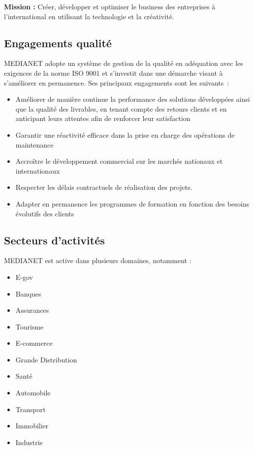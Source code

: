 \noindent
\textbf{Mission :} Créer, développer et optimiser le business des entreprises à l’international en utilisant la technologie et la créativité.

\subsection{Engagements qualité}

MEDIANET adopte un système de gestion de la qualité en adéquation avec les exigences de la norme ISO 9001 et s'investit dans une démarche visant à s'améliorer en permanence. Ses principaux engagements sont les suivants :

\begin{itemize}
\item Améliorer de manière continue la performance des solutions développées ainsi que la qualité des livrables, en tenant compte des retours clients et en anticipant leurs attentes afin de renforcer leur satisfaction
\item Garantir une réactivité efficace dans la prise en charge des opérations de maintenance
\item Accroître le développement commercial sur les marchés nationaux et internationaux
\item Respecter les délais contractuels de réalisation des projets.
\item Adapter en permanence les programmes de formation en fonction des besoins évolutifs des clients
\end{itemize}


\subsection{Secteurs d’activités}

MEDIANET est active dans plusieurs domaines, notamment :

\begin{itemize} 
    \item E-gov
    \item Banques
    \item Assurances
    \item Tourisme
    \item E-commerce
    \item Grande Distribution
    \item Santé
    \item Automobile
    \item Transport
    \item Immobilier
    \item Industrie
\end{itemize}



